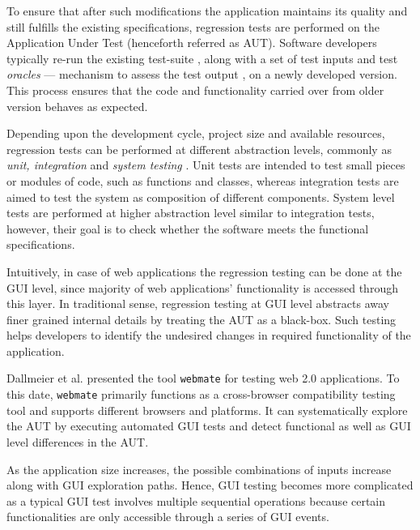 To ensure that after such modifications the application maintains its quality and still fulfills the existing specifications, regression tests are performed on the Application Under Test (henceforth referred as AUT). Software developers typically re-run the existing test-suite \cite{rothermel2001prioritizing}, \cite{elbaum2000prioritizing} along with a set of test inputs and test \textit{oracles} — mechanism to assess the test output \cite{1240304}, on a newly developed version. This process ensures that the code and functionality carried over from older version behaves as expected.

Depending upon the development cycle, project size and available resources, regression tests can be performed at different abstraction levels, commonly as \textit{unit, integration} and \textit{system testing} \cite{Mpezze}. Unit tests are intended to test small pieces or modules of code, such as functions and classes, whereas integration tests are aimed to test the system as composition of different components. System level tests are performed at higher abstraction level similar to integration tests, however, their goal is to check whether the software meets the functional specifications. 

Intuitively, in case of web applications the regression testing can be done at the GUI level, since majority of web applications’ functionality is accessed through this layer. In traditional sense, regression testing at GUI level abstracts away finer grained internal details by treating the AUT as a black-box. Such testing helps developers to identify the undesired changes in required functionality of the application.

Dallmeier et al. \cite{webmate} presented the tool \texttt{webmate} for testing web 2.0 applications. To this date, \texttt{webmate} primarily functions as a cross-browser compatibility testing tool and supports different browsers and platforms. It can systematically explore the AUT by executing automated GUI tests and detect functional as well as GUI level differences in the AUT. 

As the application size increases, the possible combinations of inputs increase along with GUI exploration paths. Hence, GUI testing becomes more complicated as a typical GUI test involves multiple sequential operations because certain functionalities are only accessible through a series of GUI events.

